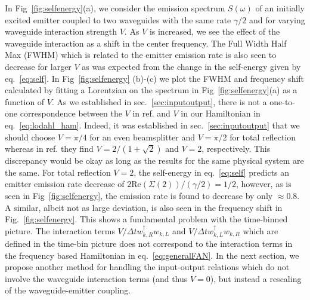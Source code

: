 In Fig~\ref{fig:selfenergy}(a), we consider the emission spectrum $S(\omega)$ of an initially excited emitter coupled to two waveguides with the same rate $\gamma/2$ and for varying waveguide interaction strength $V$. As $V$ is increased, we see the effect of the waveguide interaction as a shift in the center frequency. The Full Width Half Max (FWHM) which is related to the emitter emission rate is also seen to decrease for larger $V$ as was expected from the change in the self-energy given by eq.~\eqref{eq:self}. In Fig~\ref{fig:selfenergy} (b)-(c) we plot the FWHM and frequency shift calculated by fitting a Lorentzian on the spectrum in Fig~\ref{fig:selfenergy}(a) as a function of $V$. As we established in sec.~\ref{sec:inputoutput}, there is not a one-to-one correspondence between the $V$ in ref. \cite{Xu2016FanoTransport} and $V$ in our Hamiltonian in eq.~\eqref{eq:lodahl_ham}. Indeed, it was established in sec.~\ref{sec:inputoutput} that we should choose $V = \pi/4$ for an even beamsplitter and $V = \pi/2$ for total reflection whereas in ref. \cite{Xu2016FanoTransport} they find $V=2/(1+\sqrt{2})$ and $V=2$, respectively. This discrepancy would be okay as long as the results for the same physical system are the same. For total reflection $V=2$, the self-energy in eq.~\eqref{eq:self} predicts an emitter emission rate decrease of $2 \mathrm{Re}(\Sigma(2))/(\gamma/2) = 1/2$, however, as is seen in Fig~\ref{fig:selfenergy}, the emission rate is found to decrease by only $\approx 0.8$. A similar, albeit not as large deviation, is also seen in the frequency shift in Fig.~\ref{fig:selfenergy}. This shows a fundamental problem with the time-binned picture. The interaction terms $V/\Delta t w_{k,R}^\dagger w_{k,L}$ and $V/\Delta t w_{k,L}^\dagger w_{k,R}$ which are defined in the time-bin picture does not correspond to the interaction terms in the frequency based Hamiltonian in eq.~\eqref{eq:generalFAN}. In the next section, we propose another method for handling the input-output relations which do not involve the waveguide interaction terms (and thus $V=0$), but instead a rescaling of the waveguide-emitter coupling.

